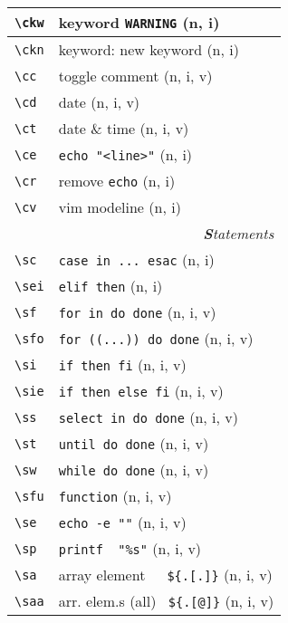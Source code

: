 \documentclass[oneside,11pt,a4paper,DIV18]{scrartcl}
\begin{document}
\begin{center}
\begin{tabular}[]{|p{11mm}|p{59mm}|}
\hline \verb'\ckw' & keyword \verb'WARNING'           \hfill (n, i)\\
\hline \verb'\ckn' & keyword: new keyword             \hfill (n, i)\\
\hline \verb'\cc'  & toggle comment                   \hfill (n, i, v)\\
\hline \verb'\cd'  & date                             \hfill (n, i, v)\\
\hline \verb'\ct'  & date \& time                     \hfill (n, i, v)\\
\hline \verb'\ce'  & \verb'echo "<line>"'             \hfill (n, i)\\
\hline \verb'\cr'  & remove \verb'echo'               \hfill (n, i)\\
\hline \verb'\cv'  & vim modeline                     \hfill (n, i)\\
\hline 
\hline
\multicolumn{2}{|r|}{\textsl{\textbf{S}tatements}}\\
\hline \verb'\sc'  & \verb'case in ... esac'               \hfill (n, i)\\
\hline \verb'\sei' & \verb'elif then'                      \hfill (n, i)\\
\hline \verb'\sf'  & \verb'for in do done'                 \hfill (n, i, v)\\
\hline \verb'\sfo' & \verb'for ((...)) do done'            \hfill (n, i, v)\\
\hline \verb'\si'  & \verb'if then fi'                     \hfill (n, i, v)\\
\hline \verb'\sie' & \verb'if then else fi'                \hfill (n, i, v)\\
\hline \verb'\ss'  & \verb'select in do done'              \hfill (n, i, v)\\
\hline \verb'\st'  & \verb'until do done'                  \hfill (n, i, v)\\
\hline \verb'\sw'  & \verb'while do done'                  \hfill (n, i, v)\\
\hline \verb'\sfu' & \verb'function'                       \hfill (n, i, v)\\
\hline \verb'\se'  & \verb'echo -e ""'                     \hfill (n, i, v)\\
\hline \verb'\sp'  & \verb'printf  "%s"'                   \hfill (n, i, v)\\
\hline \verb'\sa'  & array element\ \ \ \verb'${.[.]}'     \hfill (n, i, v)\\
\hline \verb'\saa' & arr. elem.s (all) \ \verb'${.[@]}'    \hfill (n, i, v)\\

\end{tabular}
\end{center}
\end{document}

